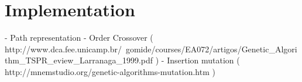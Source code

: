 \section{Implementation}
    - Path representation
    - Order Crossover ( http://www.dca.fee.unicamp.br/~gomide/courses/EA072/artigos/Genetic_Algorithm_TSPR_eview_Larranaga_1999.pdf )
    - Insertion mutation ( http://mnemstudio.org/genetic-algorithms-mutation.htm )
